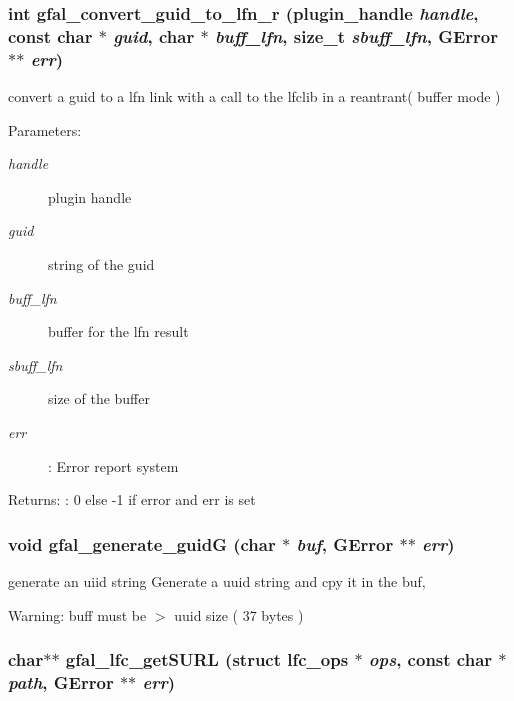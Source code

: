 \subsubsection{\setlength{\rightskip}{0pt plus 5cm}int gfal\_\-convert\_\-guid\_\-to\_\-lfn\_\-r (plugin\_\-handle {\em handle}, const char $\ast$ {\em guid}, char $\ast$ {\em buff\_\-lfn}, size\_\-t {\em sbuff\_\-lfn}, GError $\ast$$\ast$ {\em err})}\label{lfc__ifce__ng_8c_70f8470c60821b33776b4504d6bb4610}


convert a guid to a lfn link with a call to the lfclib in a reantrant( buffer mode ) \begin{Desc}
\item[Parameters:]
\begin{description}
\item[{\em handle}]plugin handle \item[{\em guid}]string of the guid \item[{\em buff\_\-lfn}]buffer for the lfn result \item[{\em sbuff\_\-lfn}]size of the buffer \item[{\em err}]: Error report system \end{description}
\end{Desc}
\begin{Desc}
\item[Returns:]: 0 else -1 if error and err is set \end{Desc}
\subsubsection{\setlength{\rightskip}{0pt plus 5cm}void gfal\_\-generate\_\-guid\-G (char $\ast$ {\em buf}, GError $\ast$$\ast$ {\em err})}\label{lfc__ifce__ng_8c_4cb5e50a1af5612463aaa525162a2e9e}


generate an uiid string Generate a uuid string and cpy it in the buf, 

\begin{Desc}
\item[Warning:]buff must be $>$ uuid size ( 37 bytes ) \end{Desc}
\subsubsection{\setlength{\rightskip}{0pt plus 5cm}char$\ast$$\ast$ gfal\_\-lfc\_\-get\-SURL (struct lfc\_\-ops $\ast$ {\em ops}, const char $\ast$ {\em path}, GError $\ast$$\ast$ {\em err})}\label{lfc__ifce__ng_8c_26c355c9cf576886a743ab1917de295d}


